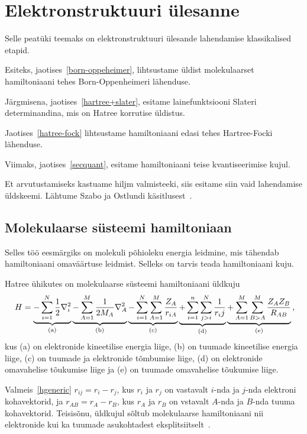 \documentclass[12pt]{report}
\begin{document}
\chapter{Elektronstruktuuri ülesanne}\label{chap:esp}

Selle peatüki teemaks on elektronstruktuuri ülesande lahendamise klassikalised etapid.

Esiteks, jaotises~\ref{born-oppeheimer}, lihtsustame üldist molekulaarset hamiltoniaani tehes Born-Oppenheimeri lähenduse.

Järgmisena, jaotises~\ref{hartree+slater}, esitame lainefunktsiooni Slateri determinandina, mis on Hatree korrutise üldistus.

Jaotises~\ref{hatree-fock} lihtsustame hamiltoniaani edasi tehes Hartree-Focki lähenduse.

Viimaks, jaotises~\ref{secquant}, esitame hamiltoniaani teise kvantiseerimise kujul.

Et arvutustamiseks kastuame hiljm valmisteeki, siis esitame siin vaid
lahendamise üldskeemi. Lähtume Szabo ja Ostlundi
käsitlusest~\cite{szabo+ostlund}.


\section{Molekulaarse süsteemi hamiltoniaan}

Selles töö eesmärgiks on molekuli põhioleku energia leidmine, mis tähendab
hamiltoniaani omaväärtuse leidmist. Selleks on tarvis teada hamiltoniaani kuju.

Hatree ühikutes on molekulaarse süsteemi hamiltoniaani üldkuju
\begin{equation}\label{hgeneric}
    H = \underbrace{-\sum_{i=1}^N\frac{1}{2}\nabla_i^2}_\mathrm{(a)}
        \underbrace{-\sum_{A=1}^M\frac{1}{2M_A}\nabla_A^2}_\mathrm{(b)}
        \underbrace{-\sum_{i=1}^N\sum_{A=1}^M\frac{Z_A}{r_{iA}}}_\mathrm{(c)}
        \underbrace{+\sum_{i=1}^n\sum_{j>i}^N\frac{1}{r_ij}}_\mathrm{(d)}
        \underbrace{+\sum_{A=1}^M\sum_{B>A}^M\frac{Z_AZ_B}{R_{AB}}}_\mathrm{(e)}\rlap{,}
\end{equation}
kus (a) on elektronide kineetilise energia liige, (b) on tuumade kineetilise energia liige, (c) on tuumade ja elektronide tõmbumise liige, (d) on elektronide omavahelise tõukumise liige ja (e) on tuumade omavahelise tõukumise liige.

Valmeis~\eqref{hgeneric} \(r_{ij} = r_i - r_j\), kus \(r_i\) ja \(r_j\) on vastavalt \(i\)-nda ja \(j\)-nda elektroni kohavektorid, ja \(r_{AB} = r_A - r_B\), kus \(r_A\) ja \(r_B\) on vstavalt \(A\)-nda ja \(B\)-nda tuuma kohavektorid.
Teisisõnu, üldkujul sõltub molekulaarse hamiltoniaani nii elektronide kui ka tuumade asukohtadest eksplitsiitselt~\cite{szabo+ostlnud}.
\end{document}
